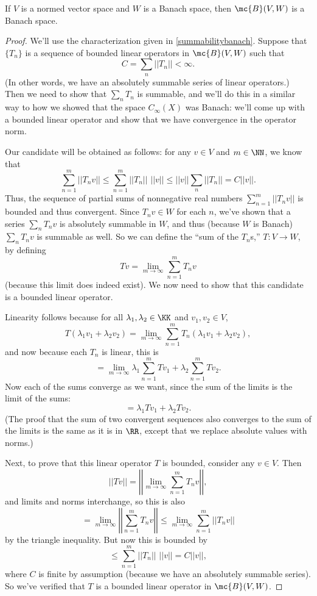 \begin{theorem}\label{banachoperatorbanach}
If $V$ is a normed vector space and $W$ is a Banach space, then $\mc{B}(V, W)$ is a Banach space.
\end{theorem}
\begin{proof}
We'll use the characterization given in \cref{summabilitybanach}. Suppose that $\{T_n\}$ is a sequence of bounded linear operators in $\mc{B}(V, W)$ such that 
\[
    C = \sum_n ||T_n|| < \infty.
\]
(In other words, we have an absolutely summable series of linear operators.) Then we need to show that $\sum_n T_n$ is summable, and we'll do this in a similar way to how we showed that the space $C_{\infty}(X)$ was Banach: we'll come up with a bounded linear operator and show that we have convergence in the operator norm.

Our candidate will be obtained as follows: for any $v \in V$ and $m \in \NN$, we know that
\[
    \sum_{n=1}^m ||T_nv|| \le \sum_{n=1}^m ||T_n|| \, \, ||v|| \le ||v|| \sum_{n} ||T_n|| = C||v||.
\]
Thus, the sequence of partial sums of nonnegative real numbers $\sum_{n=1}^m ||T_nv||$ is bounded and thus convergent. Since $T_nv \in W$ for each $n$, we've shown that a series $\sum_n T_n v$ is absolutely summable in $W$, and thus (because $W$ is Banach) $\sum_n T_n v$ is summable as well. So we can define the ``sum of the $T_n$s,'' $T: V \to W$, by defining
\[
    Tv = \lim_{m \to \infty} \sum_{n=1}^m T_nv
\]
(because this limit does indeed exist). We now need to show that this candidate is a bounded linear operator.

Linearity follows because for all $\lambda_1, \lambda_2 \in \KK$ and $v_1, v_2 \in V$, 
\[
    T(\lambda_1 v_1 + \lambda_2 v_2) = \lim_{m \to \infty} \sum_{n=1}^m T_n(\lambda_1 v_1 + \lambda_2v_2),
\]
and now because each $T_n$ is linear, this is
\[
    = \lim_{m \to \infty} \lambda_1 \sum_{n=1}^m Tv_1 + \lambda_2 \sum_{n=1}^m Tv_2. 
\]  
Now each of the sums converge as we want, since the sum of the limits is the limit of the sums:
\[
    = \lambda_1 Tv_1 + \lambda_2 Tv_2.
\]
(The proof that the sum of two convergent sequences also converges to the sum of the limits is the same as it is in $\RR$, except that we replace absolute values with norms.) 

Next, to prove that this linear operator $T$ is bounded, consider any $v \in V$. Then 
\[
    ||Tv|| = \left|\left|\lim_{m \to \infty} \sum_{n=1}^m T_n v\right|\right|,
\]
and limits and norms interchange, so this is also 
\[
    = \lim_{m \to \infty} \left|\left| \sum_{n=1}^m T_n v \right|\right| \le \lim_{m \to \infty} \sum_{n=1}^m ||T_n v||
\]
by the triangle inequality. But now this is bounded by 
\[
    \le \sum_{n=1}^m ||T_n|| \, \, ||v||= C||v||,
\]
where $C$ is finite by assumption (because we have an absolutely summable series). So we've verified that $T$ is a bounded linear operator in $\mc{B}(V, W)$.


\end{proof}
